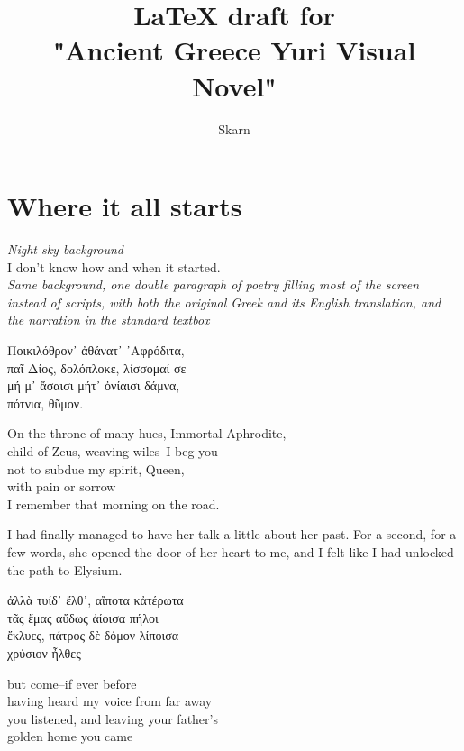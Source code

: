 \documentclass{report}
\title{LaTeX draft for \\"Ancient Greece Yuri Visual Novel"}
\author{Skarn}
\newcommand{\dcomment}[1]{
	\emph{#1}
	\\
}
\begin{document}

\maketitle

\chapter{Where it all starts}

\dcomment{
	Night sky background
}

I don't know how and when it started.\\

\dcomment{
	Same background, one double paragraph of poetry filling most of the screen instead of scripts, with both the original Greek and its English translation, and the narration in the standard textbox
}

\begin{otherlanguage}{greek}
Ποικιλόθρον᾽ ἀθάνατ᾽ ᾽Αφρόδιτα,\\
παῖ Δίος, δολόπλοκε, λίσσομαί σε\\
μή μ᾽ ἄσαισι μήτ᾽ ὀνίαισι δάμνα,\\
πότνια, θῦμον.
\end{otherlanguage}

On the throne of many hues, Immortal Aphrodite,\\
child of Zeus, weaving wiles--I beg you\\
not to subdue my spirit, Queen,\\
with pain or sorrow
\\

I remember that morning on the road.

I had finally managed to have her talk a little about her past. For a second, for a few words, she opened the door of her heart to me, and I felt like I had unlocked the path to Elysium.\\

\begin{otherlanguage}{greek}
ἀλλὰ τυίδ᾽ ἔλθ᾽, αἴποτα κἀτέρωτα\\
τᾶς ἔμας αὔδως ἀίοισα πήλοι\\
ἔκλυες, πάτρος δὲ δόμον λίποισα\\
χρύσιον ἦλθες
\end{otherlanguage}

but come--if ever before\\
having heard my voice from far away\\
you listened, and leaving your father's\\
golden home you came
\\
\end{document}
